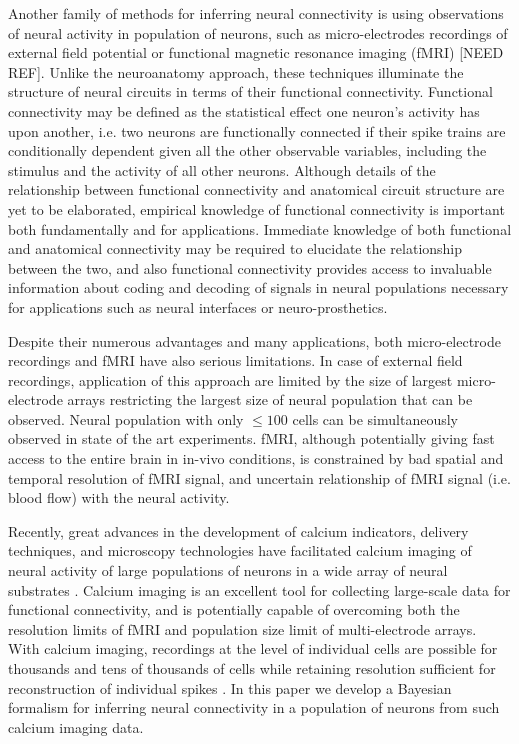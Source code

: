 \documentclass[amsmath,amssymb]{revtex4}
\begin{document}
Another family of methods for inferring neural connectivity is using observations of neural activity in population of neurons, such as micro-electrodes recordings of external field potential
\cite{Meister1994,Litke2003,Litke2004,PILL07,Stevenson2008} or functional magnetic resonance imaging (fMRI) [NEED REF].
Unlike the neuroanatomy approach, these techniques illuminate the structure of neural circuits in terms of their functional connectivity.
Functional connectivity may be defined as the statistical effect one neuron's activity has upon another, i.e. two neurons are functionally connected if their spike trains are conditionally dependent given all the other observable variables, including the stimulus and the activity of all other neurons.
Although details of the relationship between functional connectivity and anatomical circuit structure are yet to be elaborated, empirical knowledge of functional connectivity is important both fundamentally and for applications. Immediate knowledge of both functional and anatomical connectivity may be required to elucidate the relationship between the two, and also functional connectivity provides access to invaluable information about coding and decoding of signals in neural populations necessary for applications such as neural interfaces or neuro-prosthetics.

Despite their numerous advantages and many applications, both micro-electrode recordings and fMRI have also serious limitations. In case of external field recordings, application of this approach are limited by the size of largest micro-electrode arrays restricting the largest size of neural population that can be observed. Neural population with only $\leq 100$ cells can be simultaneously observed in state of the art experiments. fMRI, although potentially giving fast access to the entire brain in in-vivo conditions, is constrained by bad spatial and temporal resolution of fMRI signal, and uncertain relationship of fMRI signal (i.e. blood flow) with the neural activity.

Recently, great advances in the development of calcium indicators, delivery techniques, and microscopy technologies have facilitated calcium imaging of neural activity of large populations of neurons in a wide array of neural substrates \cite{Ikegaya2005,Nagayama2007,Nevian2007,Gobel07b}. Calcium imaging is an excellent tool for collecting large-scale data for functional connectivity, and is potentially capable of overcoming both the resolution limits of fMRI and population size limit of multi-electrode arrays. With calcium imaging, recordings at the level of individual cells are possible for thousands and tens of thousands of cells while retaining resolution sufficient for reconstruction of individual spikes \cite{Ikegaya2005}. In this paper we develop a Bayesian formalism for inferring neural connectivity in a population of neurons from such calcium imaging data.
\end{document}
